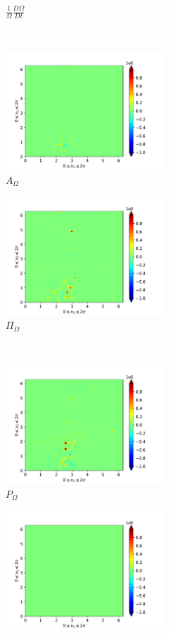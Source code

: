 \begin{figure}[H]
\begin{subfigure}[H]{0.45\textwidth}
        \caption{$\frac{1}{\Omega} \frac{D \Omega}{Dt}$}
    \end{subfigure}
    ~
    \begin{subfigure}{0.45\textwidth}
        \includegraphics[height=1.75in]{media/run-cds-65-5k/A-enst-4750.png}
        \caption{$A_{\Omega}$}
    \end{subfigure}
    \newline
    \begin{subfigure}{0.45\textwidth}
        \includegraphics[height=1.75in]{media/run-cds-65-5k/Pi-enst-4750.png}
        \caption{$\Pi_{\Omega}$}
    \end{subfigure}
    ~
    \begin{subfigure}{0.45\textwidth}
        \includegraphics[height=1.75in]{media/run-cds-65-5k/P-enst-4750.png}
        \caption{$P_{\Omega}$}
    \end{subfigure}
    \newline
    \begin{subfigure}{0.45\textwidth}
        \includegraphics[height=1.75in]{media/run-cds-65-5k/B-enst-4750.png}

\end{subfigure}
\end{figure}
